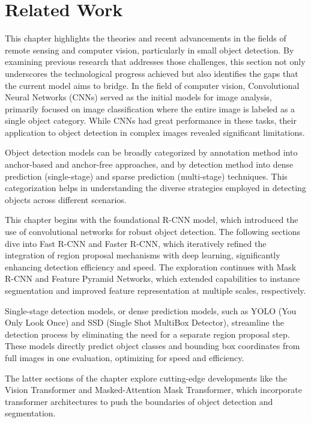 \chapter{Related Work}

This chapter highlights the theories and recent advancements in the fields of remote sensing and computer vision, particularly in small object detection.
By examining previous research that addresses those challenges, this section not only underscores the technological progress achieved but also identifies 
the gaps that the current model aims to bridge. In the field of computer vision, Convolutional Neural Networks (CNNs) \cite{cnn} served as the initial models for 
image analysis, primarily focused on image classification where the entire image is labeled as a single object category. While CNNs had great performance 
in these tasks, their application to object detection in complex images revealed significant limitations.

Object detection models can be broadly categorized by annotation method into anchor-based and anchor-free approaches, and by detection method into dense 
prediction (single-stage) and sparse prediction (multi-stage) techniques. This categorization helps in understanding the diverse strategies employed in 
detecting objects across different scenarios.

This chapter begins with the foundational R-CNN model, which introduced the use of convolutional networks for robust object detection. The following sections 
dive into Fast R-CNN and Faster R-CNN, which iteratively refined the integration of region proposal mechanisms with deep learning, significantly enhancing 
detection efficiency and speed. The exploration continues with Mask R-CNN and Feature Pyramid Networks, which extended capabilities to instance segmentation 
and improved feature representation at multiple scales, respectively.

Single-stage detection models, or dense prediction models, such as YOLO (You Only Look Once) and SSD (Single Shot MultiBox Detector), streamline the detection 
process by eliminating the need for a separate region proposal step. These models directly predict object classes and bounding box coordinates from full 
images in one evaluation, optimizing for speed and efficiency.

The latter sections of the chapter explore cutting-edge developments like the Vision Transformer and Masked-Attention Mask Transformer, which incorporate 
transformer architectures to push the boundaries of object detection and segmentation.



